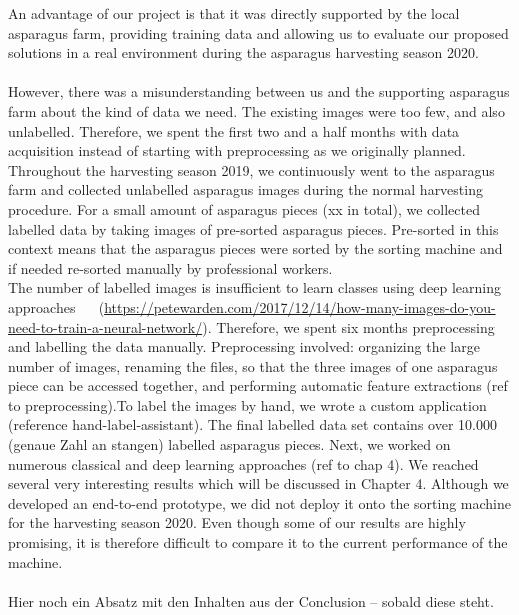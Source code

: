 An advantage of our project is that it was directly supported by the local asparagus farm, providing training data and allowing us to evaluate our proposed solutions in a real environment during the asparagus harvesting season 2020. \\
\\
However, there was a misunderstanding between us and the supporting asparagus farm about the kind of data we need. The existing images were too few, and also unlabelled. Therefore, we spent the first two and a half months with data acquisition instead of starting with preprocessing as we originally planned. Throughout the harvesting season 2019, we continuously went to the asparagus farm and collected unlabelled asparagus images during the normal harvesting procedure. For a small amount of asparagus pieces (xx in total), we collected labelled data by taking images of pre-sorted asparagus pieces. Pre-sorted in this context means that the asparagus pieces were sorted by the sorting machine and if needed re-sorted manually by professional workers. \\
The number of labelled images is insufficient to learn classes using deep learning approaches~\citep{russakovsky2013detecting} ~\citep{russakovsky2010attribute} (\url{https://petewarden.com/2017/12/14/how-many-images-do-you-need-to-train-a-neural-network/}). Therefore, we spent six months preprocessing and labelling the data manually. Preprocessing involved: organizing the large number of images, renaming the files, so that the three images of one asparagus piece can be accessed together, and performing automatic feature extractions (ref to preprocessing).To label the images by hand, we wrote a custom application (reference hand-label-assistant). The final labelled data set contains over 10.000 (genaue Zahl an stangen) labelled asparagus pieces. Next, we worked on numerous classical and deep learning approaches (ref to chap 4). We reached several very interesting results which will be discussed in Chapter 4. Although we developed an end-to-end prototype, we did not deploy it onto the sorting machine for the harvesting season 2020. Even though some of our results are highly promising, it is therefore difficult to compare it to the current performance of the machine. \\
 \\
Hier noch ein Absatz mit den Inhalten aus der Conclusion – sobald diese steht. 



